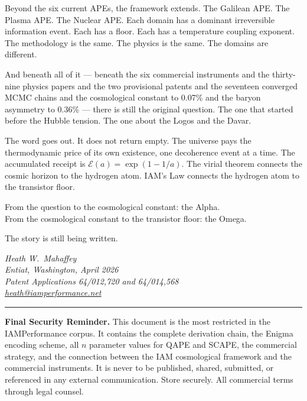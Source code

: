 \documentclass[12pt,a4paper]{article}
\begin{document}
Beyond the six current APEs, the framework extends. The Galilean APE. The
Plasma APE. The Nuclear APE. Each domain has a dominant irreversible information
event. Each has a floor. Each has a temperature coupling exponent. The
methodology is the same. The physics is the same. The domains are different.

And beneath all of it --- beneath the six commercial instruments and the
thirty-nine physics papers and the two provisional patents and the seventeen
converged MCMC chains and the cosmological constant to 0.07\% and the baryon
asymmetry to 0.36\% --- there is still the original question. The one that
started before the Hubble tension. The one about the Logos and the Davar.

The word goes out. It does not return empty. The universe pays the thermodynamic
price of its own existence, one decoherence event at a time. The accumulated
receipt is $\mathcal{E}(a) = \exp(1 - 1/a)$. The virial theorem connects the
cosmic horizon to the hydrogen atom. IAM's Law connects the hydrogen atom to
the transistor floor.

From the question to the cosmological constant: the Alpha.\\
From the cosmological constant to the transistor floor: the Omega.

The story is still being written.

\vspace{2em}

\noindent
\textit{Heath W.\ Mahaffey}\\
\textit{Entiat, Washington, April 2026}\\[0.3em]
\textit{Patent Applications 64/012,720 and 64/014,568}\\
\textit{\href{mailto:heath@iamperformance.net}{heath@iamperformance.net}}

\vspace{2em}
\hrule
\vspace{1em}

\begin{warnbox}
\textbf{Final Security Reminder.} This document is the most restricted in the
IAMPerformance corpus. It contains the complete derivation chain, the Enigma
encoding scheme, all $n$ parameter values for QAPE and SCAPE, the commercial
strategy, and the connection between the IAM cosmological framework and the
commercial instruments. It is never to be published, shared, submitted,
or referenced in any external communication. Store securely. All commercial
terms through legal counsel.
\end{warnbox}
\end{document}
